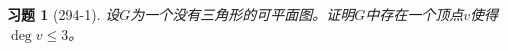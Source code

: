 \documentclass{article}
\begin{document}
\begin{CJK}{UTF8}{gbsn}
  \newtheorem*{Exercise}{习题}
  \huge
\begin{Exercise}[294-1]
  设$G$为一个没有三角形的可平面图。证明$G$中存在一个顶点$v$使得$\deg v \leq 3$。
\end{Exercise}

\end{CJK}
\end{document}
